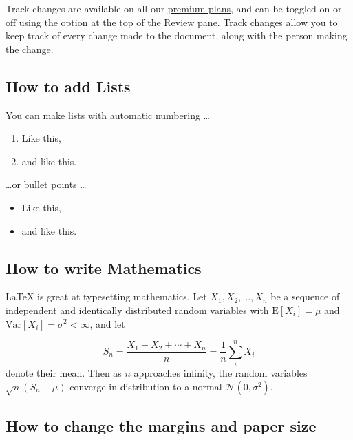 \documentclass{article}
\begin{document}
Track changes are available on all our \href{https:
//www.
overleaf.
com/user/subscription/plans}{premium plans},
 and can be toggled on or off using the option at the top of the Review pane.
 Track changes allow you to keep track of every change made to the document,
 along with the person making the change.
 





\subsection{How to add Lists}

You can make lists with automatic numbering \dots

\begin{enumerate}
	\item Like this,
	\item and like this.
\end{enumerate}





\dots or bullet points \dots
\begin{itemize}
	\item Like this,
	\item and like this.
\end{itemize}





\subsection{How to write Mathematics}





\LaTeX{} is great at typesetting mathematics. Let $X_1, X_2, \ldots, X_n$ be a sequence of independent and identically distributed random variables with $\text{E}[X_i] = \mu$ and $\text{Var}[X_i] = \sigma^2 < \infty$, and let





\[S_n = \frac{X_1 + X_2 + \cdots + X_n}{n}
      = \frac{1}{n}\sum_{i}^{n} X_i\]
denote their mean.
 Then as $n$ approaches infinity,
 the random variables $\sqrt{n}(S_n - \mu)$ converge in distribution to a normal $\mathcal{N}(0,
 \sigma^2)$.





\subsection{How to change the margins and paper size}
\end{document}
